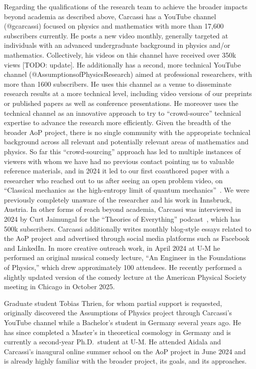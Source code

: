 Regarding the qualifications of the research team to achieve the broader impacts beyond academia as described above, Carcassi has a YouTube channel (@gcarcassi) focused on physics and mathematics with more than 17,600 subscribers currently.  He posts a new video monthly, generally targeted at individuals with an advanced undergraduate background in physics and/or mathematics.  Collectively, his videos on this channel have received over 350k views [TODO: update]. He additionally has a second, more technical YouTube channel (@AssumptionsofPhysicsResearch) aimed at professional researchers, with more than 1600 subscribers.  He uses this channel as a venue to disseminate research results at a more technical level, including video versions of our preprints or published papers as well as conference presentations.  He moreover uses the technical channel as an innovative approach to try to ``crowd-source'' technical expertise to advance the research more efficiently.  Given the breadth of the broader AoP project, there is no single community with the appropriate technical background across all relevant and potentially relevant areas of mathematics and physics.  So far this ``crowd-sourcing'' approach has led to multiple instances of viewers with whom we have had no previous contact pointing us to valuable reference materials, and in 2024 it led to our first coauthored paper with a researcher who reached out to us after seeing an open problem video, on ``Classical mechanics as the high-entropy limit of quantum mechanics''~\cite{aop-classicallimit}. We were previously completely unaware of the researcher and his work in Innsbruck, Austria.  In other forms of reach beyond academia, Carcassi was interviewed in 2024 by Curt Jaimungal for the ``Theories of Everything'' podcast~\cite{Carcassi-ToEInterview}, which has 500k subscribers.  Carcassi additionally writes monthly blog-style essays related to the AoP project and advertised through social media platforms such as Facebook and LinkedIn.  In more creative outreach work, in April 2024 at U-M he performed an original musical comedy lecture, ``An Engineer in the Foundations of Physics,'' which drew approximately 100 attendees. He recently performed a slightly updated version of the comedy lecture at the American Physical Society meeting in Chicago in October 2025.

Graduate student Tobias Thrien, for whom partial support is requested, originally discovered the Assumptions of Physics project through Carcassi's YouTube channel while a Bachelor's student in Germany several years ago.  He has since completed a Master's in theoretical cosmology in Germany and is currently a second-year Ph.D.~student at U-M.  He attended Aidala and Carcassi's inaugural online summer school on the AoP project in June 2024 and is already highly familiar with the broader project, its goals, and its approaches.  



